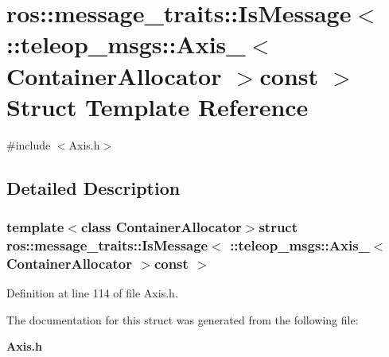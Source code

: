 \section{ros::message\_\-traits::IsMessage$<$ ::teleop\_\-msgs::Axis\_\-$<$ ContainerAllocator $>$const $>$ Struct Template Reference}
\label{structros_1_1message__traits_1_1IsMessage_3_01_1_1teleop__msgs_1_1Axis___3_01ContainerAllocator_01_4const_01_01_4}


{\ttfamily \#include $<$Axis.h$>$}



\subsection{Detailed Description}
\subsubsection*{template$<$class ContainerAllocator$>$struct ros::message\_\-traits::IsMessage$<$ ::teleop\_\-msgs::Axis\_\-$<$ ContainerAllocator $>$const  $>$}



Definition at line 114 of file Axis.h.



The documentation for this struct was generated from the following file:\begin{DoxyCompactItemize}
\item 
{\bf Axis.h}\end{DoxyCompactItemize}

